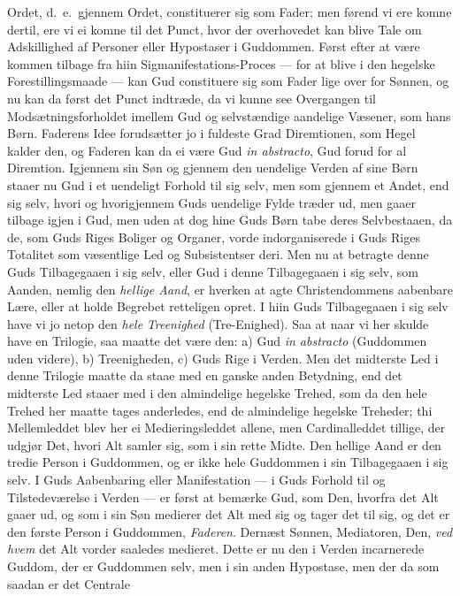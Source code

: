 \documentclass[12pt,a4paper]{book}
\newcommand{\apage}[1]{\marginnote{\footnotesize\textit{[#1]}}}
\begin{document}
Ordet, d.\ e.\ gjennem Ordet, constituerer sig som Fader; men førend vi ere
komne dertil, ere vi ei komne til det Punct, hvor der overhovedet kan blive Tale
om Adskillighed af Personer eller Hypostaser i Guddommen. Først efter at være
kommen tilbage fra hiin Sigmanifestations-Proces --- for at blive i den hegelske
Forestillingsmaade --- kan Gud constituere sig som Fader lige over for Sønnen, og
nu kan da først det Punct indtræde, da vi kunne see Overgangen til
Modsætningsforholdet imellem Gud og selvstændige aandelige Væsener, som hans
Børn. Faderens Idee forudsætter jo i fuldeste Grad Diremtionen, som Hegel kalder
den, og Faderen kan da ei være Gud \textit{in abstracto}, Gud forud for al
Diremtion. Igjennem sin Søn og gjennem den uendelige Verden af sine Børn staaer
nu Gud i et uendeligt Forhold til sig selv, men som gjennem et Andet, end sig
selv, hvori og hvorigjennem Guds uendelige Fylde træder ud, men gaaer tilbage
igjen i Gud, men uden at dog hine Guds Børn tabe deres Selvbestaaen, da de, som
Guds Riges Boliger og Organer, vorde indorganiserede i Guds Riges Totalitet som
væsentlige Led og Subsistentser deri. Men nu at betragte denne Guds \apage{142} Tilbagegaaen
i sig selv, eller Gud i denne Tilbagegaaen i sig selv, som Aanden, nemlig den
\emph{hellige Aand}, er hverken at agte Christendommens aabenbare Lære, eller at holde
Begrebet retteligen opret. I hiin Guds Tilbagegaaen i sig selv have vi jo netop
den \emph{hele} \emph{Treenighed} (Tre-Enighed). Saa at naar vi her skulde have en
Trilogie, saa maatte det være den: a) Gud \textit{in abstracto} (Guddommen uden
videre), b) Treenigheden, c) Guds Rige i Verden. Men det midterste Led i denne
Trilogie maatte da staae med en ganske anden Betydning, end det midterste Led
staaer med i den almindelige hegelske Trehed, som da den hele Trehed her maatte
tages anderledes, end de almindelige hegelske Treheder; thi Mellemleddet blev
her ei Medieringsleddet allene, men Cardinalleddet tillige, der udgjør Det, hvori
Alt samler sig, som i sin rette Midte. Den hellige Aand er den tredie Person i
Guddommen, og er ikke hele Guddommen i sin Tilbagegaaen i sig selv. I Guds
Aabenbaring eller Manifestation --- i Guds Forhold til og Tilstedeværelse i
Verden --- er først at bemærke Gud, som Den, hvorfra det Alt gaaer ud, og som i
sin Søn medierer det Alt med sig og tager det til sig, og det er den første
Person i Guddommen, \emph{Faderen}. Dernæst Sønnen, Mediatoren, Den, \emph{ved hvem} det Alt
vorder saaledes medieret. Dette er nu den i Verden incarnerede Guddom, der er
Guddommen selv, men i sin anden Hypostase, men der da som saadan er det Centrale
\end{document}
